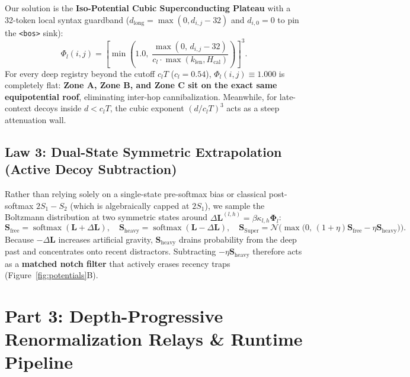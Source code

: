 \documentclass[11pt,letterpaper]{article}
\begin{document}
Our solution is the \textbf{Iso-Potential Cubic Superconducting Plateau} with a 32-token local syntax guardband ($d_{\text{long}} = \max(0, d_{i,j} - 32)$ and $d_{i,0} = 0$ to pin the \texttt{<bos>} sink):
\begin{equation}
\Phi_l(i, j) = \left[ \min\!\left(1.0, \; \frac{\max(0, \, d_{i,j} - 32)}{c_l \cdot \max(k_{\text{len}}, H_{\text{cal}})}\right) \right]^3.
\label{eq:cubic}
\end{equation}
For every deep registry beyond the cutoff $c_l T$ ($c_l = 0.54$), $\Phi_l(i,j) \equiv 1.000$ is completely flat: \textbf{Zone A, Zone B, and Zone C sit on the exact same equipotential roof}, eliminating inter-hop cannibalization. Meanwhile, for late-context decoys inside $d < c_l T$, the cubic exponent $(d / c_l T)^3$ acts as a steep attenuation wall.

\subsection{Law 3: Dual-State Symmetric Extrapolation (Active Decoy Subtraction)}
Rather than relying solely on a single-state pre-softmax bias or classical post-softmax $2S_1 - S_2$ (which is algebraically capped at $2S_1$), we sample the Boltzmann distribution at two symmetric states around $\Delta \mathbf{L}^{(l,h)} = \beta \kappa_{l,h} \boldsymbol{\Phi}_l$:
\begin{equation}
\mathbf{S}_{\text{free}} = \operatorname{softmax}(\mathbf{L} + \Delta \mathbf{L}), \quad
\mathbf{S}_{\text{heavy}} = \operatorname{softmax}(\mathbf{L} - \Delta \mathbf{L}), \quad
\mathbf{S}_{\text{Super}} = \mathcal{N}\!\Big(\max\big(0, \, (1+\eta)\mathbf{S}_{\text{free}} - \eta \mathbf{S}_{\text{heavy}}\big)\Big).
\end{equation}
Because $-\Delta \mathbf{L}$ increases artificial gravity, $\mathbf{S}_{\text{heavy}}$ drains probability from the deep past and concentrates onto recent distractors. Subtracting $-\eta \mathbf{S}_{\text{heavy}}$ therefore acts as a \textbf{matched notch filter} that actively erases recency traps (Figure~\ref{fig:potentials}B).

\section{Part 3: Depth-Progressive Renormalization Relays \& Runtime Pipeline}
\end{document}
